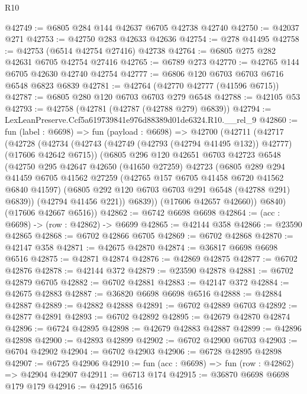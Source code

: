 \begin{lexlean}{R10}
\begin{coremodule}
@42749 := @6805 @284 @144 @42637 @6705 @42738 @42740
@42750 := @42037 @271
@42753 := @42750 @283 @42633 @42636
@42754 := @278 @41495
@42758 := @42753 (@6514 @42754 @27416) @42738
@42764 := @6805 @275 @282 @42631 @6705 @42754 @27416
@42765 := @6789 @273
@42770 := @42765 @144 @6705 @42630 @42740 @42754
@42777 := @6806 @120 @6703 @6703 @6716 @6548 @6823 @6839
@42781 := @42764 (@42770 @42777 (@41596 @6715))
@42787 := @6805 @280 @120 @6703 @6703 @279 @6548
@42788 := @42105 @53
@42793 := @42758 (@42781 (@42787 (@42788 @279) @6839))
@42794 := LexLeanPreserve.Ccf5a619739841e976d88389d01de6324.R10.__rel_9
@42860 := fun (label : @6698) =>
  fun (payload : @6698) =>
  @42700
    (@42711
      (@42717
        (@42728
          (@42734
            (@42743 (@42749 (@42793 (@42794 @41495 @132)) @42777) (@17606 @42642 @6715))
            (@6805
              @296
              @120
              @42651
              @6703
              @42723
              @6548
              (@42750
                @295
                @42647
                @42650
                (@41650 @27259)
                @42723
                (@6805
                  @289
                  @294
                  @41459
                  @6705
                  @41562
                  @27259
                  (@42765 @157 @6705 @41458 @6720 @41562 @6840 @41597)
                  (@6805 @292 @120 @6703 @6703 @291 @6548 (@42788 @291) @6839))
                (@42794 @41456 @221))
              @6839))
          (@17606 @42657 @42660))
        @6840)
      (@17606 @42667 @6516))
@42862 := @6742 @6698 @6698
@42864 := (acc : @6698) -> (row : @42862) -> @6699
@42865 := @42144 @358
@42866 := @23590 @42865
@42868 := @6702 @42866 @6705
@42869 := @6702 @42868
@42870 := @42147 @358
@42871 := @42675 @42870
@42874 := @36817 @6698 @6698 @6516
@42875 := @42871 @42874
@42876 := @42869 @42875
@42877 := @6702 @42876
@42878 := @42144 @372
@42879 := @23590 @42878
@42881 := @6702 @42879 @6705
@42882 := @6702 @42881
@42883 := @42147 @372
@42884 := @42675 @42883
@42887 := @36820 @6698 @6698 @6516
@42888 := @42884 @42887
@42889 := @42882 @42888
@42891 := @6702 @42889 @6703
@42892 := @42877 @42891
@42893 := @6702 @42892
@42895 := @42679 @42870 @42874
@42896 := @6724 @42895
@42898 := @42679 @42883 @42887
@42899 := @42896 @42898
@42900 := @42893 @42899
@42902 := @6702 @42900 @6703
@42903 := @6704 @42902
@42904 := @6702 @42903
@42906 := @6728 @42895 @42898
@42907 := @6725 @42906
@42910 := fun (acc : @6698) => fun (row : @42862) => @42904 @42907
@42911 := @6713 @174
@42915 := @36870 @6698 @6698 @179 @179
@42916 := @42915 @6516

\end{coremodule}
\end{lexlean}
